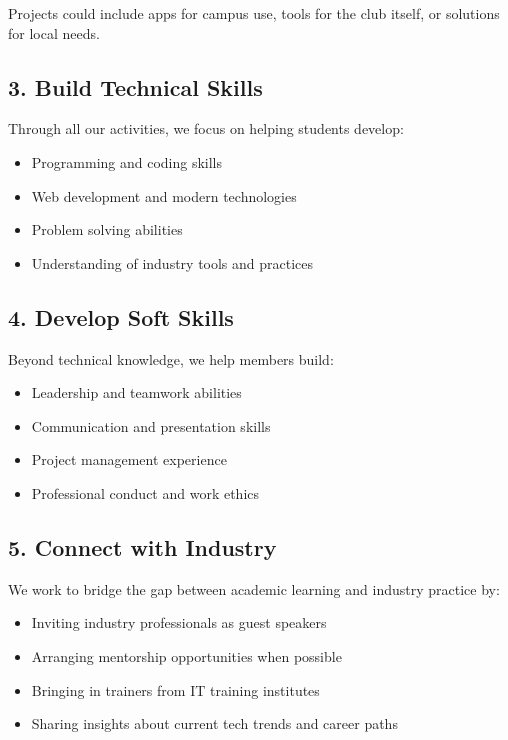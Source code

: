 Projects could include apps for campus use, tools for the club itself, or solutions for local needs.

\subsection*{3. Build Technical Skills}

Through all our activities, we focus on helping students develop:

\begin{itemize}[leftmargin=2em, itemsep=0.3em]
    \item Programming and coding skills
    \item Web development and modern technologies
    \item Problem solving abilities
    \item Understanding of industry tools and practices
\end{itemize}

\subsection*{4. Develop Soft Skills}

Beyond technical knowledge, we help members build:

\begin{itemize}[leftmargin=2em, itemsep=0.3em]
    \item Leadership and teamwork abilities
    \item Communication and presentation skills
    \item Project management experience
    \item Professional conduct and work ethics
\end{itemize}

\subsection*{5. Connect with Industry}

We work to bridge the gap between academic learning and industry practice by:

\begin{itemize}[leftmargin=2em, itemsep=0.3em]
    \item Inviting industry professionals as guest speakers
    \item Arranging mentorship opportunities when possible
    \item Bringing in trainers from IT training institutes
    \item Sharing insights about current tech trends and career paths
\end{itemize}

